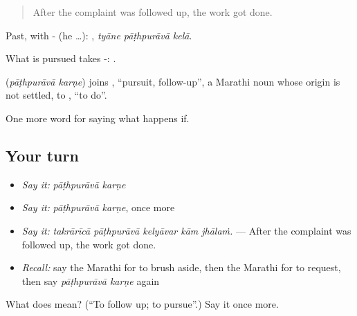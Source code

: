 \begin{quote}
After the complaint was followed up, the work got done.
\end{quote}

Past, with - (he …):   , \emph{tyāne pāṭhpurāvā kelā}.

What is pursued takes -:  .

\begin{cousinweb}
\textbf{ } (\emph{pāṭhpurāvā karṇe}) joins , \textquotedblleft{}pursuit, follow-up\textquotedblright{}, a Marathi noun whose origin is not settled, to , \textquotedblleft{}to do\textquotedblright{}.
\end{cousinweb}

\begin{grammarlens}[title={What you've built}]
One more word for saying what happens if.
\end{grammarlens}

\subsection*{Your turn}
\begin{itemize}
\raggedright
  \item \emph{Say it:} \emph{pāṭhpurāvā karṇe}
  \item \emph{Say it:} \emph{pāṭhpurāvā karṇe}, once more
  \item \emph{Say it:} \emph{takrārīcā pāṭhpurāvā kelyāvar kām jhālaṁ.} — After the complaint was followed up, the work got done.
  \item \emph{Recall:} say the Marathi for to brush aside, then the Marathi for to request, then say \emph{pāṭhpurāvā karṇe} again
\end{itemize}

\begin{tcolorbox}[breakable,colback=teal!4,colframe=teal!35!black,title={Before you move on}]
What does   mean? (\textquotedblleft{}To follow up; to pursue\textquotedblright{}.) Say it once more.
\end{tcolorbox}
